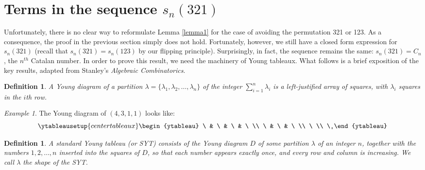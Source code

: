 \documentclass[11pt,letterpaper,twoside,english]{article}
\theoremstyle{theorem}
\newtheorem{definition}[theorem]{Definition}
\theoremstyle{remark}
\newtheorem{example}{Example}
\begin{document}
\section{Terms in the sequence $s_n(321)$}

Unfortunately, there is no clear way to reformulate Lemma \ref{lemma1} for the case of avoiding the permutation 321 or 123. As a consequence, the proof in the previous section simply does not hold. Fortunately, however, we still have a closed form expression for $s_n(321)$ (recall that $s_n(321)=s_n(123)$ by our flipping principle). Surprisingly, in fact, the sequence remains the same: $s_n(321)=C_n$, the $n^{th}$ Catalan number. In order to prove this result, we need the machinery of Young tableaux. What follows is a brief exposition of the key results, adapted from Stanley's \emph{Algebraic Combinatorics}.

\begin{definition}
A Young diagram of a partition $\lambda=\{\lambda_1, \lambda_2, \ldots, \lambda_n\}$ of the integer $\sum_{i=1}^n \lambda_i$ is a left-justified array of squares, with $\lambda_i$ squares in the $i$th row.
\end{definition}
\begin{example}
The Young diagram of $(4, 3, 1, 1)$ looks like:
\[
\ytableausetup{centertableaux}
\begin{ytableau}
\ & \ & \ & \ \\
\ & \ & \ \\
\ \\
\
\end{ytableau}
\]
\end{example}

\begin{definition}
A standard Young tableau (or SYT) consists of the Young diagram $D$ of some partition $\lambda$ of an integer $n$, together with the numbers $1, 2, \ldots, n$ inserted into the squares of $D$, so that each number appears exactly once, and every row and column is \emph{increasing}. We call $\lambda$ the \emph{shape} of the SYT.
\end{definition}
\end{document}
